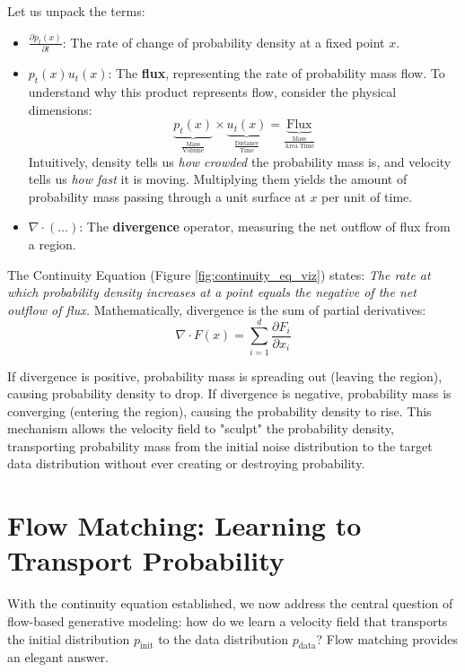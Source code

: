 \documentclass{book}
\begin{document}
Let us unpack the terms:
\begin{itemize}
    \item $\frac{\partial p_t(x)}{\partial t}$: The rate of change of probability density at a fixed point $x$.
    \item $p_t(x) u_t(x)$: The \textbf{flux}, representing the rate of probability mass flow. To understand why this product represents flow, consider the physical dimensions:
\[
\underbrace{p_t(x)}_{\frac{\text{Mass}}{\text{Volume}}} \times \underbrace{u_t(x)}_{\frac{\text{Distance}}{\text{Time}}} = \underbrace{\text{Flux}}_{\frac{\text{Mass}}{\text{Area} \cdot \text{Time}}}
\]
Intuitively, density tells us \textit{how crowded} the probability mass is, and velocity tells us \textit{how fast} it is moving. Multiplying them yields the amount of probability mass passing through a unit surface at $x$ per unit of time.
    \item $\nabla \cdot (\dots)$: The \textbf{divergence} operator, measuring the net outflow of flux from a region.
\end{itemize}

The Continuity Equation (Figure \ref{fig:continuity_eq_viz}) states: \textit{The rate at which probability density increases at a point equals the negative of the net outflow of flux.} Mathematically, divergence is the sum of partial derivatives:
\begin{equation}
\nabla \cdot F(x) = \sum_{i=1}^d \frac{\partial F_i}{\partial x_i}
\end{equation}

If divergence is positive, probability mass is spreading out (leaving the region), causing probability density to drop. If divergence is negative, probability mass is converging (entering the region), causing the probability density to rise. This mechanism allows the velocity field to "sculpt" the probability density, transporting probability mass from the initial noise distribution to the target data distribution without ever creating or destroying probability.


\section{Flow Matching: Learning to Transport Probability}

With the continuity equation established, we now address the central question of flow-based generative modeling: how do we learn a velocity field that transports the initial distribution $p_{\text{init}}$ to the data distribution $p_{\text{data}}$? Flow matching provides an elegant answer.
\end{document}
